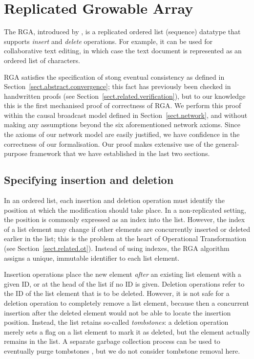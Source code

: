 \section{Replicated Growable Array}
\label{sect.rga}

The RGA, introduced by \citet{Roh:2011dw}, is a replicated ordered list (sequence) datatype that supports \emph{insert} and \emph{delete} operations.
For example, it can be used for collaborative text editing, in which case the text document is represented as an ordered list of characters.

RGA satisfies the specification of stong eventual consistency as defined in Section~\ref{sect.abstract.convergence}; this fact has previously been checked in handwritten proofs (see Section~\ref{sect.related.verification}), but to our knowledge this is the first mechanised proof of correctness of RGA.
We perform this proof within the causal broadcast model defined in Section~\ref{sect.network}, and without making any assumptions beyond the six aforementioned network axioms.
Since the axioms of our network model are easily justified, we have confidence in the correctness of our formalisation.
Our proof makes extensive use of the general-purpose framework that we have established in the last two sections.

\subsection{Specifying insertion and deletion}\label{sect.rga.spec}

In an ordered list, each insertion and deletion operation must identify the position at which the modification should take place.
In a non-replicated setting, the position is commonly expressed as an index into the list.
However, the index of a list element may change if other elements are concurrently inserted or deleted earlier in the list; this is the problem at the heart of Operational Transformation (see Section~\ref{sect.related.ot}).
Instead of using indexes, the RGA algorithm assigns a unique, immutable identifier to each list element.

Insertion operations place the new element \emph{after} an existing list element with a given ID, or at the head of the list if no ID is given.
Deletion operations refer to the ID of the list element that is to be deleted.
However, it is not safe for a deletion operation to completely remove a list element, because then a concurrent insertion after the deleted element would not be able to locate the insertion position.
Instead, the list retains so-called \emph{tombstones}: a deletion operation merely sets a flag on a list element to mark it as deleted, but the element actually remains in the list.
A separate garbage collection process can be used to eventually purge tombstones \cite{Roh:2011dw}, but we do not consider tombstone removal here.


